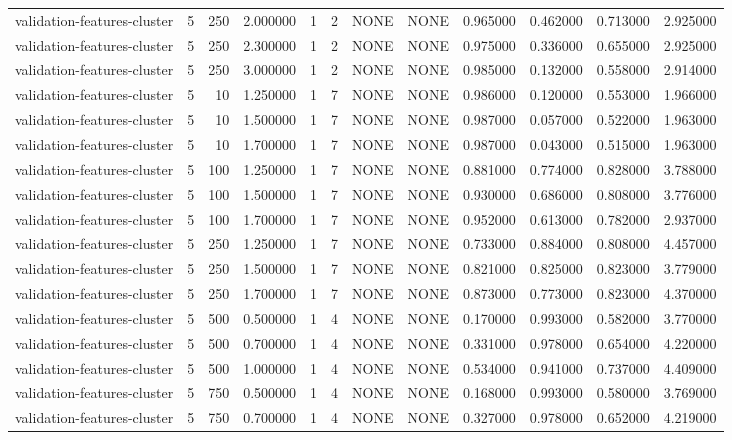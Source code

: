 \begin{tabular}{lrrrllllrrrr}
validation-features-cluster & 5 & 250 & 2.000000 & 1 & 2 & NONE & NONE & 0.965000 & 0.462000 & 0.713000 & 2.925000 \\
validation-features-cluster & 5 & 250 & 2.300000 & 1 & 2 & NONE & NONE & 0.975000 & 0.336000 & 0.655000 & 2.925000 \\
validation-features-cluster & 5 & 250 & 3.000000 & 1 & 2 & NONE & NONE & 0.985000 & 0.132000 & 0.558000 & 2.914000 \\
validation-features-cluster & 5 & 10 & 1.250000 & 1 & 7 & NONE & NONE & 0.986000 & 0.120000 & 0.553000 & 1.966000 \\
validation-features-cluster & 5 & 10 & 1.500000 & 1 & 7 & NONE & NONE & 0.987000 & 0.057000 & 0.522000 & 1.963000 \\
validation-features-cluster & 5 & 10 & 1.700000 & 1 & 7 & NONE & NONE & 0.987000 & 0.043000 & 0.515000 & 1.963000 \\
validation-features-cluster & 5 & 100 & 1.250000 & 1 & 7 & NONE & NONE & 0.881000 & 0.774000 & 0.828000 & 3.788000 \\
validation-features-cluster & 5 & 100 & 1.500000 & 1 & 7 & NONE & NONE & 0.930000 & 0.686000 & 0.808000 & 3.776000 \\
validation-features-cluster & 5 & 100 & 1.700000 & 1 & 7 & NONE & NONE & 0.952000 & 0.613000 & 0.782000 & 2.937000 \\
validation-features-cluster & 5 & 250 & 1.250000 & 1 & 7 & NONE & NONE & 0.733000 & 0.884000 & 0.808000 & 4.457000 \\
validation-features-cluster & 5 & 250 & 1.500000 & 1 & 7 & NONE & NONE & 0.821000 & 0.825000 & 0.823000 & 3.779000 \\
validation-features-cluster & 5 & 250 & 1.700000 & 1 & 7 & NONE & NONE & 0.873000 & 0.773000 & 0.823000 & 4.370000 \\
validation-features-cluster & 5 & 500 & 0.500000 & 1 & 4 & NONE & NONE & 0.170000 & 0.993000 & 0.582000 & 3.770000 \\
validation-features-cluster & 5 & 500 & 0.700000 & 1 & 4 & NONE & NONE & 0.331000 & 0.978000 & 0.654000 & 4.220000 \\
validation-features-cluster & 5 & 500 & 1.000000 & 1 & 4 & NONE & NONE & 0.534000 & 0.941000 & 0.737000 & 4.409000 \\
validation-features-cluster & 5 & 750 & 0.500000 & 1 & 4 & NONE & NONE & 0.168000 & 0.993000 & 0.580000 & 3.769000 \\
validation-features-cluster & 5 & 750 & 0.700000 & 1 & 4 & NONE & NONE & 0.327000 & 0.978000 & 0.652000 & 4.219000 \\

\end{tabular}
